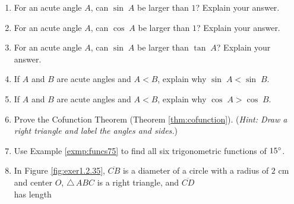 {\begin{enumerate}[\bfseries 1.]
\begin{enumerate}[\bfseries (a)]
  \end{enumerate}
 \item For an acute angle $A$, can $\sin\;A$ be larger than $1$? Explain your answer.
 \item For an acute angle $A$, can $\cos\;A$ be larger than $1$? Explain your answer.
 \item For an acute angle $A$, can $\sin\;A$ be larger than $\tan\;A$? Explain your answer.
 \item If $A$ and $B$ are acute angles and $A < B$, explain why $\sin\;A < \sin\;B$.
 \item If $A$ and $B$ are acute angles and $A < B$, explain why $\cos\;A > \cos\;B$.
 \item Prove the Cofunction Theorem (Theorem \ref{thm:cofunction}). (\emph{Hint: Draw a right
  triangle and label the angles and sides.})
 \item Use Example \ref{exmp:funcs75} to find all six trigonometric functions of $15^\circ$.
 \piccaption[]{\label{fig:exer1.2.35}}
 \item\label{exer:circle1237} In Figure \ref{fig:exer1.2.35}, $\overline{CB}$ is a diameter of a
  circle with a radius of
  $2$ cm and center $O$, $\triangle\,ABC$ is a right triangle, and $\overline{CD}$\\has length

\end{enumerate}}
